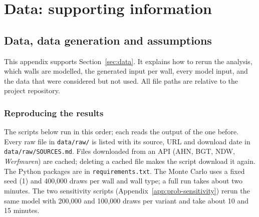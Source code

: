 \chapter{Data: supporting information}
\label{app:data-chapter}


\section{Data, data generation and assumptions}\label{app:data}

This appendix supports Section~\ref{sec:data}. It explains how to rerun the
analysis, which walls are modelled, the generated input per wall, every model
input, and the data that were considered but not used. All file paths are
relative to the project repository.

\subsection{Reproducing the results}\label{app:data-run}

The scripts below run in this order; each reads the output of the one before.
Every raw file in \texttt{data/raw/} is listed with its source, URL and
download date in \texttt{data/raw/SOURCES.md}. Files downloaded from an API
(AHN, BGT, NDW, \emph{Werfmuren}) are cached; deleting a cached file makes the
script download it again. The Python packages are in
\texttt{requirements.txt}. The Monte Carlo uses a fixed seed (1) and
400{,}000 draws per wall and wall type; a full run takes about two minutes.
The two sensitivity scripts (Appendix~\ref{app:prob-sensitivity}) rerun the
same model with 200{,}000 and 100{,}000 draws per variant and take about
10 and 15 minutes.

